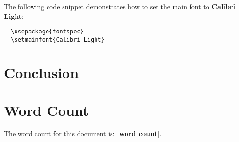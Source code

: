 \documentclass[12pt]{article}
\begin{document}
  The following code snippet demonstrates how to set the main font to \textbf{Calibri Light}:
  
  \begin{verbatim}
  \usepackage{fontspec}
  \setmainfont{Calibri Light}
  \end{verbatim}


  \section{Conclusion}
  \label{sec:conclusion}


  \section*{Word Count}
  \label{sec:word-count}

  The word count for this document is: \textbf{[word count]}.

  \printbibliography
  
\end{document}
